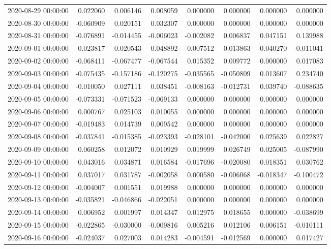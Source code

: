 \begin{tabular}{lrrrrrrr}
2020-08-29 00:00:00 & 0.022060 & 0.006146 & 0.008059 & 0.000000 & 0.000000 & 0.000000 & 0.000000 \\
2020-08-30 00:00:00 & -0.060909 & 0.020151 & 0.032307 & 0.000000 & 0.000000 & 0.000000 & 0.000000 \\
2020-08-31 00:00:00 & -0.076891 & -0.014455 & -0.006023 & -0.002082 & 0.006837 & 0.047151 & 0.139988 \\
2020-09-01 00:00:00 & 0.023817 & 0.020543 & 0.048892 & 0.007512 & 0.013863 & -0.040270 & -0.011041 \\
2020-09-02 00:00:00 & -0.068411 & -0.067477 & -0.067544 & 0.015352 & 0.009772 & 0.000000 & 0.017083 \\
2020-09-03 00:00:00 & -0.075435 & -0.157186 & -0.120275 & -0.035565 & -0.050809 & 0.013607 & 0.234740 \\
2020-09-04 00:00:00 & -0.010050 & 0.027111 & 0.038451 & -0.008163 & -0.012731 & 0.039740 & -0.088635 \\
2020-09-05 00:00:00 & -0.073331 & -0.071523 & -0.069133 & 0.000000 & 0.000000 & 0.000000 & 0.000000 \\
2020-09-06 00:00:00 & 0.000767 & 0.025103 & 0.010055 & 0.000000 & 0.000000 & 0.000000 & 0.000000 \\
2020-09-07 00:00:00 & -0.019483 & 0.014739 & 0.009542 & 0.000000 & 0.000000 & 0.000000 & 0.000000 \\
2020-09-08 00:00:00 & -0.037841 & -0.015385 & -0.023393 & -0.028101 & -0.042000 & 0.025639 & 0.022827 \\
2020-09-09 00:00:00 & 0.060258 & 0.012072 & 0.010929 & 0.019999 & 0.026749 & 0.025005 & -0.087990 \\
2020-09-10 00:00:00 & 0.043016 & 0.034871 & 0.016584 & -0.017696 & -0.020080 & 0.018351 & 0.030762 \\
2020-09-11 00:00:00 & 0.037017 & 0.031787 & -0.002058 & 0.000580 & -0.006068 & -0.018347 & -0.100472 \\
2020-09-12 00:00:00 & -0.004007 & 0.001551 & 0.019988 & 0.000000 & 0.000000 & 0.000000 & 0.000000 \\
2020-09-13 00:00:00 & -0.035821 & -0.046866 & -0.022051 & 0.000000 & 0.000000 & 0.000000 & 0.000000 \\
2020-09-14 00:00:00 & 0.006952 & 0.001997 & 0.014347 & 0.012975 & 0.018655 & 0.000000 & -0.038699 \\
2020-09-15 00:00:00 & -0.022865 & -0.030000 & -0.009816 & 0.005216 & 0.012106 & 0.006151 & -0.010111 \\
2020-09-16 00:00:00 & -0.024037 & 0.027003 & 0.014283 & -0.004591 & -0.012569 & 0.000000 & 0.017427 \\

\end{tabular}
